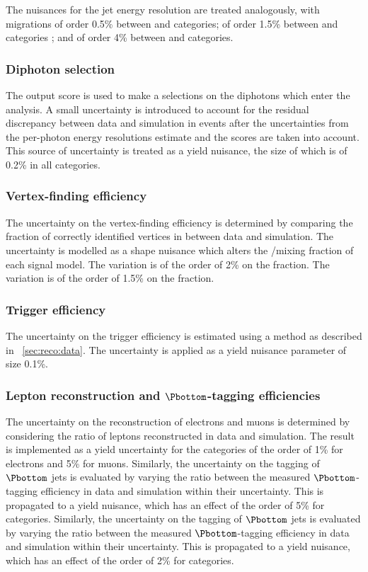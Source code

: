 The nuisances for the jet energy resolution are treated analogously, with migrations of order 0.5\% between  and  categories; of order 1.5\% between \VBF and \Untagged categories ; and of order 4\% between \TTHTag and \Untagged categories.

\subsubsection{Diphoton selection}
The \DiPhoBdt output score is used to make a selections on the diphotons which enter the analysis. A small uncertainty is introduced to account for the residual discrepancy between data and simulation in \Zee events after the uncertainties from the per-photon energy resolutions estimate and the \PhoIdBdt scores are taken into account. This source of uncertainty is treated as a yield nuisance, the size of which is of 0.2\% in all categories. 

\subsubsection{Vertex-finding efficiency}
The uncertainty on the vertex-finding efficiency is determined by comparing the fraction of correctly identified vertices in \Zmumu between data and simulation. The uncertainty is modelled as a shape nuisance which alters the \RV/\WV mixing fraction of each signal model. 
\ifNewAnalysis
The variation is of the order of 2\% on the \RV fraction.
\else
The variation is of the order of 1.5\% on the \RV fraction.
\fi

\subsubsection{Trigger efficiency}
The uncertainty on the trigger efficiency is estimated using a \TagAndProbe method as described in \Sec~\ref{sec:reco:data}. The uncertainty is applied as a yield nuisance parameter of size 0.1\%.

\subsubsection{Lepton reconstruction and $\Pbottom$-tagging efficiencies}
The uncertainty on the reconstruction of electrons and muons is determined by considering the ratio of leptons reconstructed in data and simulation. The result is implemented as a yield uncertainty for the \TTHTag categories of the order of 1\% for electrons and 5\% for muons.
\ifNewAnalysis
Similarly, the uncertainty on the tagging of $\Pbottom$ jets is evaluated by varying the ratio between the measured $\Pbottom$-tagging efficiency in data and simulation within their uncertainty. This is propagated to a yield nuisance, which has an effect of the order of 5\% for \TTHTag categories.
\else
Similarly, the uncertainty on the tagging of $\Pbottom$ jets is evaluated by varying the ratio between the measured $\Pbottom$-tagging efficiency in data and simulation within their uncertainty. This is propagated to a yield nuisance, which has an effect of the order of 2\% for \TTHTag categories.
\fi

